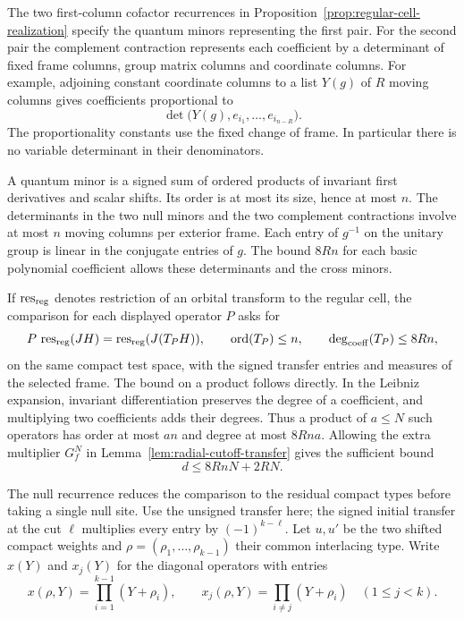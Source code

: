 The two first-column cofactor recurrences in Proposition~\ref{prop:regular-cell-realization} specify the quantum minors representing the first pair. For the second pair the complement contraction represents each coefficient by a determinant of fixed frame columns, group matrix columns and coordinate columns. For example, adjoining constant coordinate columns to a list \(Y(g)\) of \(R\) moving columns gives coefficients proportional to
\[
           \det\bigl(Y(g),e_{i_1},\ldots,e_{i_{n-R}}\bigr).
\]
The proportionality constants use the fixed change of frame. In particular there is no variable determinant in their denominators.

A quantum minor is a signed sum of ordered products of invariant first derivatives and scalar shifts. Its order is at most its size, hence at most \(n\). The determinants in the two null minors and the two complement contractions involve at most \(n\) moving columns per exterior frame. Each entry of \(g^{-1}\) on the unitary group is linear in the conjugate entries of \(g\). The bound \(8Rn\) for each basic polynomial coefficient allows these determinants and the cross minors.

If \(\operatorname{res}_{\rm reg}\) denotes restriction of an orbital transform to the regular cell, the comparison for each displayed operator \(P\) asks for
\[
             P\,\operatorname{res}_{\rm reg}(JH)=\operatorname{res}_{\rm reg}(J(T_PH)),\qquad
 \operatorname{ord}(T_P)\le n,\qquad \deg_{\rm coeff}(T_P)\le8Rn ,
\]
on the same compact test space, with the signed transfer entries and measures of the selected frame. The bound on a product follows directly. In the Leibniz expansion, invariant differentiation preserves the degree of a coefficient, and multiplying two coefficients adds their degrees. Thus a product of \(a\le N\) such operators has order at most \(a n\) and degree at most \(8Rna\). Allowing the extra multiplier \(G_f^N\) in Lemma~\ref{lem:radial-cutoff-transfer} gives the sufficient bound
\[
                       d\le8RnN+2RN .
\]

The null recurrence reduces the comparison to the residual compact
types before taking a single null site. Use the unsigned transfer
here; the signed initial transfer at the cut \(\ell\) multiplies
every entry by \((-1)^{k-\ell}\). Let \(u,u'\) be the two shifted
compact weights and \(\rho=(\rho_1,\ldots,\rho_{k-1})\) their common
interlacing type. Write \(x(Y)\) and \(x_j(Y)\) for the diagonal
operators with entries
\[
 x(\rho,Y)=\prod_{i=1}^{k-1}(Y+\rho_i),\qquad
 x_j(\rho,Y)=\prod_{i\ne j}(Y+\rho_i)\quad(1\le j<k).
\]

